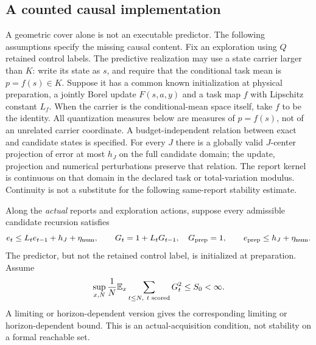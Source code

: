 \subsection{A counted causal implementation}
A geometric cover alone is not an executable predictor. The following assumptions specify the missing causal content. Fix an exploration using $Q$ retained control labels. The predictive realization may use a state carrier larger than $K$: write its state as $s$, and require that the conditional task mean is $p=f(s)\in K$. Suppose it has a common known initialization at physical preparation, a jointly Borel update $F(s,a,y)$ and a task map $f$ with Lipschitz constant $L_f$. When the carrier is the conditional-mean space itself, take $f$ to be the identity. All quantization measures below are measures of $p=f(s)$, not of an unrelated carrier coordinate. A budget-independent relation between exact and candidate states is specified. For every $J$ there is a globally valid $J$-center projection of error at most $h_J$ on the full candidate domain; the update, projection and numerical perturbations preserve that relation. The report kernel is continuous on that domain in the declared task or total-variation modulus. Continuity is not a substitute for the following same-report stability estimate.

Along the \emph{actual} reports and exploration actions, suppose every admissible candidate recursion satisfies
\begin{equation}\label{eq:gain-recursion}
 e_t\le L_t e_{t-1}+h_J+\eta_{\rm num},
 \qquad
 G_t=1+L_tG_{t-1},\quad G_{\rm prep}=1,
 \qquad e_{\rm prep}\le h_J+\eta_{\rm num}.
\end{equation}
The predictor, but not the retained control label, is initialized at preparation. Assume
\begin{equation}\label{eq:occupied-stability}
 \sup_{x,N}\frac1N\mathbb E_x\sum_{t\le N,\ t\text{ scored}}G_t^2\le S_0<\infty.
\end{equation}
A limiting or horizon-dependent version gives the corresponding limiting or horizon-dependent bound. This is an actual-acquisition condition, not stability on a formal reachable set.

